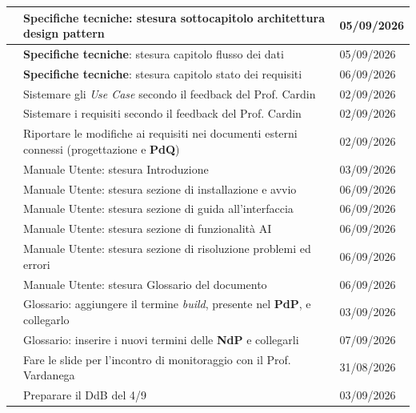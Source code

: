 \documentclass[12pt, a4paper]{article}
\begin{document}
\begin{xltabular}{\textwidth}{|l|X|l|}
         & \textbf{Specifiche tecniche}: stesura sottocapitolo architettura design pattern & 05/09/2026 \\ \hline
         & \textbf{Specifiche tecniche}: stesura capitolo flusso dei dati & 05/09/2026 \\ \hline
         & \textbf{Specifiche tecniche}: stesura capitolo stato dei requisiti & 06/09/2026 \\ \hline
         & Sistemare gli \textit{Use Case} secondo il feedback del Prof. Cardin & 02/09/2026 \\ \hline
         & Sistemare i requisiti secondo il feedback del Prof. Cardin & 02/09/2026 \\ \hline
         & Riportare le modifiche ai requisiti nei documenti esterni connessi (progettazione e \textbf{PdQ}) & 02/09/2026 \\ \hline
         & Manuale Utente: stesura Introduzione & 03/09/2026 \\ \hline
         & Manuale Utente: stesura sezione di installazione e avvio & 06/09/2026 \\ \hline
         & Manuale Utente: stesura sezione di guida all'interfaccia & 06/09/2026 \\ \hline
         & Manuale Utente: stesura sezione di funzionalità AI & 06/09/2026 \\ \hline
         & Manuale Utente: stesura sezione di risoluzione problemi ed errori & 06/09/2026 \\ \hline
         & Manuale Utente: stesura Glossario del documento & 06/09/2026 \\ \hline
         & Glossario: aggiungere il termine \textit{build}, presente nel \textbf{PdP}, e collegarlo & 03/09/2026 \\ \hline
         & Glossario: inserire i nuovi termini delle \textbf{NdP} e collegarli & 07/09/2026 \\ \hline
         & Fare le slide per l'incontro di monitoraggio con il Prof. Vardanega & 31/08/2026 \\ \hline
         & Preparare il DdB del 4/9 & 03/09/2026 \\ \hline

\end{xltabular}
\end{document}
